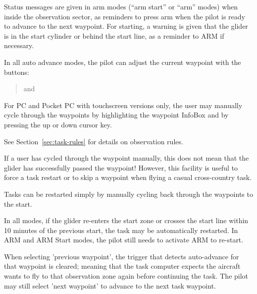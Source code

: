 \documentclass[a4paper,12pt]{refrep}
\newcommand{\InfoBox}[0]{{InfoBox}}
\begin{document}
Status messages are given in arm modes (``arm start'' or ``arm''
modes) when inside the observation sector, as reminders to press arm
when the pilot is ready to advance to the next waypoint.
For starting, a warning is given that the glider is in the start
cylinder or behind the start line, as a reminder to ARM if necessary.

In all auto advance modes, the pilot can adjust the current waypoint
with the buttons:

\begin{quote}
\blink{} and \blink{}
\end{quote}

For PC and Pocket PC with touchscreen versions only, the user may
manually cycle through the waypoints by highlighting the waypoint
{\InfoBox} and by pressing the up or down cursor key.

See Section~\ref{sec:task-rules} for details on observation rules.

If a user has cycled through the waypoint manually, this does not mean
that the glider has successfully passed the waypoint!  However, this
facility is useful to force a task restart or to skip a waypoint when
flying a casual cross-country task.

\tip Tasks can be restarted simply by manually cycling back through the
waypoints to the start.

In all modes, if the glider re-enters the start zone or crosses the
start line within 10 minutes of the previous start, the task may be
automatically restarted.  In ARM and ARM Start modes, the pilot still
needs to activate ARM to re-start.

When selecting 'previous waypoint', the trigger that detects
auto-advance for that waypoint is cleared; meaning that the task
computer expects the aircraft wants to fly to that observation zone
again before continuing the task.  The pilot may still select 'next
waypoint' to advance to the next task waypoint.
\end{document}
